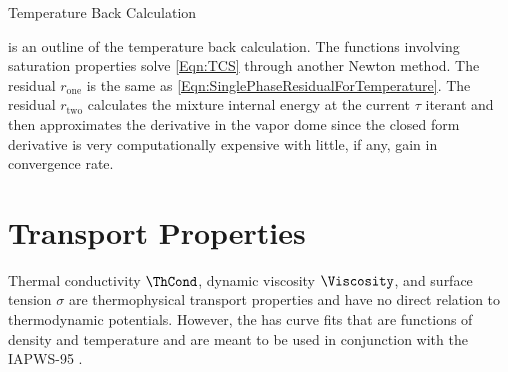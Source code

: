 \begin{algorithm}[t]
    \caption{Temperature Back Calculation}
    \label{Algo:TemperatureBackCalc}
\end{algorithm}

 is an outline of the temperature back calculation.  
The functions involving saturation properties solve \cref{Eqn:TCS} through another Newton method.
The residual $r_{\text{one}}$ is the same as \cref{Eqn:SinglePhaseResidualForTemperature}.
The residual $r_{\text{two}}$ calculates the mixture internal energy at the current $\tau$ iterant and then approximates the derivative in the vapor dome since the closed form derivative is very computationally expensive with little, if any, gain in convergence rate.

\section{Transport Properties}\label{Section:TransportProps}
Thermal conductivity $\ThCond$, dynamic viscosity $\Viscosity$, and surface tension $\sigma$ are thermophysical transport properties and have no direct relation to thermodynamic potentials.
However, the  has curve fits that are functions of density and temperature and are meant to be used in conjunction with the IAPWS-95  \cite{iapws_release_2008,iapws_release_2011,iapws_release_2014}.


